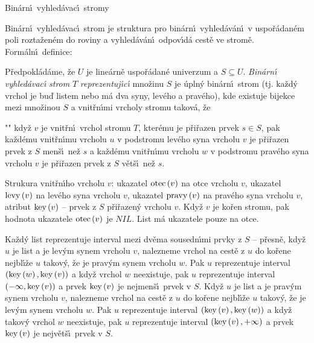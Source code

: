 \heading 
Bin\'arn\'\i\ vyhled\'avac\'\i\ stromy
\endheading

\flushpar Bin\'arn\'\i\ vyhled\'avac\'\i\ strom je struktura pro bin\'ar\-n\'\i\ 
vyhled\'av\'an\'\i\ v uspo\v r\'ada\-n\'em poli rozta\-\v zen\'em do roviny a 
vyhled\'av\'an\'\i\ odpo\-v\'\i\-d\'a cest\v e ve stro\-m\v e. Form\'aln\'\i\ 
definice:

\flushpar P\v redpokl\'ad\'ame, \v ze $U$ je line\'arn\v e uspo\v r\'adan\'e 
univerzum a $S\subseteq U$.  \emph{Bin\'arn\'\i} \emph{vyhled\'avac\'\i} 
\emph{strom} $T$ \emph{reprezentuj\'\i c\'\i} mno\v zinu $S$ je \'upln\'y 
bin\'arn\'\i\ strom (tj. ka\v zd\'y vrchol je bu\v d listem nebo m\'a 
dva syny, lev\'eho a prav\'eho), kde existuje bijekce mezi 
mno\v zinou $S$ a vnit\v rn\'\i mi vrcholy stromu takov\'a, \v ze
\roster
\item"{}"
kdy\v z $v$ je vnit\v rn\'\i\ vrchol stromu $T$, kter\'emu je p\v ri\v razen 
prvek $s\in S$, pak ka\v zd\'emu vnit\v rn\'\i mu vrcholu $u$ v 
podstromu lev\'eho syna vrcholu $v$ je p\v ri\v razen prvek z $S$ 
men\v s\'\i\ ne\v z $s$ a ka\v zd\'emu vnit\v rn\'\i mu vrcholu $
w$ v 
podstromu prav\'eho syna vrcholu $v$ je p\v ri\v razen prvek z $S$ 
v\v et\v s\'\i\ ne\v z $s$.
\endroster
\medskip

\flushpar Strukura vnit\v rn\'\i ho vrcholu $v$:\newline 
ukazatel $\operatorname{otec}\left(v\right)$ na otce vrcholu $v$,\newline 
ukazatel $\operatorname{levy}\left(v\right)$ na lev\'eho syna vrcholu $v$,\newline 
ukazatel $\operatorname{pravy}\left(v\right)$ na prav\'eho syna vrcholu $v$,\newline 
atribut $\operatorname{key}\left(v\right)$ -- prvek z $S$ p\v ri\v razen\'y vrcholu $v$.
Kdy\v z $v$ je ko\v ren stromu, pak hodnota ukazatele $\operatorname{otec}\left(v\right)$ 
je $NIL$. List m\'a ukazatele pouze na otce.
\medskip

\flushpar Ka\v zd\'y list reprezentuje interval mezi dv\v ema 
sousedn\'\i mi prvky z $S$ -- p\v resn\v e, kdy\v z $u$ je list a je 
lev\'ym synem vrcholu $v$, nalezneme vrchol na cest\v e z $u$ 
do ko\v rene nejbl\'\i\v ze $u$ takov\'y, \v ze je prav\'ym synem 
vrcholu $w$. Pak $u$ repre\-zentuje interval $\left(\operatorname{key}\left(w\right),\operatorname{key}\left(v\right)\right)$ a 
kdy\v z vrchol $w$ neexistuje, pak $u$ repre\-zentuje 
interval $\left(-\infty ,\operatorname{key}\left(v\right)\right)$ a prvek $\operatorname{key}\left(v\right)$ je nej\-men\v s\'\i\ prvek v 
$S$.  Kdy\v z $u$ je list a je prav\'ym synem vrcholu $v$, 
nalezneme vrchol na cest\v e z $u$ do ko\v rene nejbl\'\i\v ze 
$u$ takov\'y, \v ze je lev\'ym synem vrcholu $w$. Pak $u$ repre\-zentuje 
interval $\left(\operatorname{key}\left(v\right),\operatorname{key}\left(w\right)\right)$ a kdy\v z takov\'y vrchol $w$ neexistuje, 
pak $u$ repre\-zentuje interval $\left(\operatorname{key}\left(v\right),+\infty \right)$ a prvek $\operatorname{key}
\left(v\right)$ 
je nejv\v et\v s\'\i\ prvek v $S$.  
\medskip

